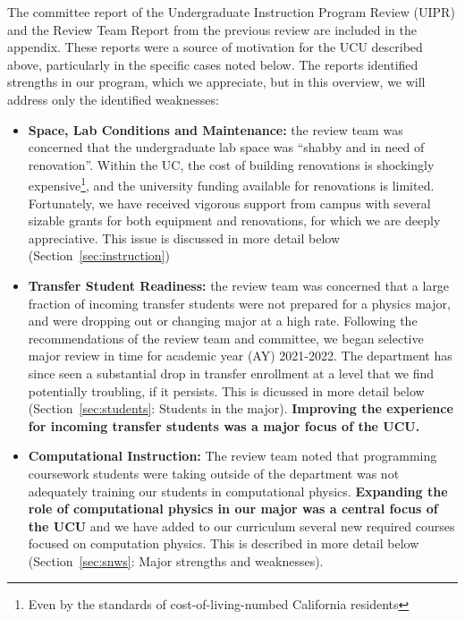 \documentclass[12pt]{article}
\begin{document}
\noindent
The committee report of the Undergraduate Instruction Program Review
(UIPR) and the Review Team Report from the previous review are
included in the appendix.  These reports were a source of motivation
for the UCU described above, particularly in the specific cases noted
below.  The reports identified strengths in our program, which we
appreciate, but in this overview, we will address only the identified
weaknesses:
\begin{itemize}

\item {\bf Space, Lab Conditions and Maintenance:} the review team was
  concerned that the undergraduate lab space was ``shabby and in need
  of renovation''.  Within the UC, the cost of building renovations is
  shockingly expensive\footnote{Even by the standards of
    cost-of-living-numbed California residents}, and the university
  funding available for renovations is limited.  Fortunately, we have
  received vigorous support from campus with several sizable grants
  for both equipment and renovations, for which we are deeply
  appreciative.  This issue is discussed in more detail below (Section~\ref{sec:instruction})
  
\item {\bf Transfer Student Readiness:} the review team was concerned
  that a large fraction of incoming transfer students were not
  prepared for a physics major, and were dropping out or changing
  major at a high rate.  Following the recommendations of the review
  team and committee, we began selective major review in time for
  academic year (AY) 2021-2022.  The department has since seen a
  substantial drop in transfer enrollment at a level that we find
  potentially troubling, if it persists.  This is dicussed in more
  detail below (Section~\ref{sec:students}: Students in the major).
  {\bf Improving the experience for incoming transfer students was a major
  focus of the UCU.}

\item {\bf Computational Instruction:} The review team noted that
  programming coursework students were taking outside of the
  department was not adequately training our students in computational
  physics.  {\bf Expanding the role of computational physics in our
    major was a central focus of the UCU} and we have added to our
  curriculum several new required courses focused on computation
  physics.  This is described in more detail below
  (Section~\ref{sec:snws}: Major strengths and weaknesses).
  

\end{itemize}
\end{document}
